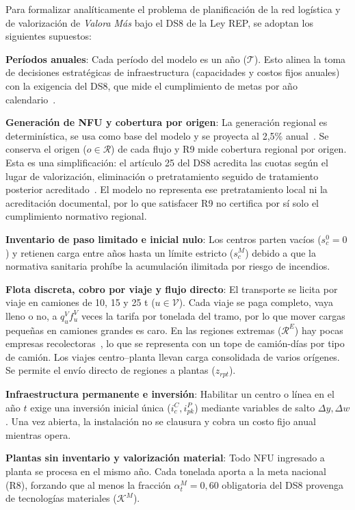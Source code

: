 \documentclass[letterpaper]{article}
\begin{document}
Para formalizar analíticamente el problema de planificación de la red logística y de valorización de \textit{Valora Más} bajo el DS8 de la Ley REP, se adoptan los siguientes supuestos:

\textbf{Períodos anuales}: Cada período del modelo es un año ($\mathcal{T}$). Esto alinea la toma de decisiones estratégicas de infraestructura (capacidades y costos fijos anuales) con la exigencia del DS8, que mide el cumplimiento de metas por año calendario~\cite{DS8}.

\textbf{Generación de NFU y cobertura por origen}: La generación regional es determinística, se usa como base del modelo y se proyecta al 2,5\% anual~\cite{kyklos2026}. Se conserva el origen ($o \in \mathcal{R}$) de cada flujo y R9 mide cobertura regional por origen. Esta es una simplificación: el artículo 25 del DS8 acredita las cuotas según el lugar de valorización, eliminación o pretratamiento seguido de tratamiento posterior acreditado~\cite{DS8}. El modelo no representa ese pretratamiento local ni la acreditación documental, por lo que satisfacer R9 no certifica por sí solo el cumplimiento normativo regional.

\textbf{Inventario de paso limitado e inicial nulo}: Los centros parten vacíos ($s^{0}_{c}=0$) y retienen carga entre años hasta un límite estricto ($s^{M}_{c}$) debido a que la normativa sanitaria prohíbe la acumulación ilimitada por riesgo de incendios.

\textbf{Flota discreta, cobro por viaje y flujo directo}: El transporte se licita por viaje en camiones de 10, 15 y 25 t ($u \in \mathcal{V}$). Cada viaje se paga completo, vaya lleno o no, a $q^{V}_{u} f^{V}_{u}$ veces la tarifa por tonelada del tramo, por lo que mover cargas pequeñas en camiones grandes es caro. En las regiones extremas ($\mathcal{R}^{E}$) hay pocas empresas recolectoras~\cite{paiscircular2026}, lo que se representa con un tope de camión-días por tipo de camión. Los viajes centro--planta llevan carga consolidada de varios orígenes. Se permite el envío directo de regiones a plantas ($z_{rpt}$).

\textbf{Infraestructura permanente e inversión}: Habilitar un centro o línea en el año $t$ exige una inversión inicial única ($i^{C}_{c}, i^{P}_{pk}$) mediante variables de salto $\Delta y, \Delta w$. Una vez abierta, la instalación no se clausura y cobra un costo fijo anual mientras opera.

\textbf{Plantas sin inventario y valorización material}: Todo NFU ingresado a planta se procesa en el mismo año. Cada tonelada aporta a la meta nacional (R8), forzando que al menos la fracción $\alpha^{M}_{t} = 0,60$ obligatoria del DS8 provenga de tecnologías materiales ($\mathcal{K}^{M}$).
\end{document}

